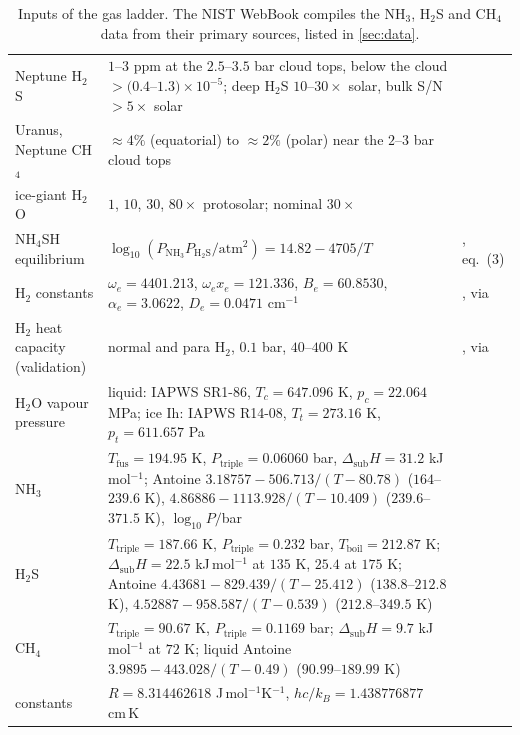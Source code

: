 \documentclass[11pt]{article}
\theoremstyle{definition}\newtheorem{definition}[theorem]{Definition}
\theoremstyle{remark}\newtheorem{remark}[theorem]{Remark}
\newcommand{\NH}{\mathrm{NH_3}}\newcommand{\HS}{\mathrm{H_2S}}\newcommand{\NHSH}{\mathrm{NH_4SH}}
\begin{document}
\begin{table}[!htb]
\begin{tabular}{@{}>{\raggedright\arraybackslash}p{3.0cm}>{\raggedright\arraybackslash}p{8.1cm}>{\raggedright\arraybackslash}p{3.8cm}@{}}
Neptune H$_2$S & $1$--$3$ ppm at the $2.5$--$3.5$ bar cloud tops, below the cloud $>(0.4$--$1.3)\times10^{-5}$; deep H$_2$S $10$--$30\times$ solar, bulk S/N $>5\times$ solar & \cite{Irwin2019a,dePater1991}\\
Uranus, Neptune CH$_4$ & $\approx4\%$ (equatorial) to $\approx2\%$ (polar) near the $2$--$3$ bar cloud tops & \cite{Irwin2019b}\\
ice-giant H$_2$O & $1$, $10$, $30$, $80\times$ protosolar; nominal $30\times$ & \cite{Atreya2020,Molter2021}\\
NH$_4$SH equilibrium & $\log_{10}(P_{\NH}P_{\HS}/\mathrm{atm}^2)=14.82-4705/T$ & \cite{AtreyaWong}, eq.~(3)\\
H$_2$ constants & $\omega_e=4401.213$, $\omega_ex_e=121.336$, $B_e=60.8530$, $\alpha_e=3.0622$, $D_e=0.0471$ cm$^{-1}$ & \cite{HuberHerzberg}, via \cite{NISTWebBook}\\
H$_2$ heat capacity (validation) & normal and para H$_2$, $0.1$ bar, $40$--$400$ K & \cite{Leachman}, via \cite{NISTWebBook}\\
H$_2$O vapour pressure & liquid: IAPWS SR1-86, $T_c=647.096$ K, $p_c=22.064$ MPa; ice Ih: IAPWS R14-08, $T_t=273.16$ K, $p_t=611.657$ Pa & \cite{WagnerPruss,Wagner2011}\\
NH$_3$ & $T_\mathrm{fus}=194.95$ K, $P_\mathrm{triple}=0.06060$ bar, $\Delta_\mathrm{sub}H=31.2$ kJ\,mol$^{-1}$; Antoine $3.18757-506.713/(T-80.78)$ ($164$--$239.6$ K), $4.86886-1113.928/(T-10.409)$ ($239.6$--$371.5$ K), $\log_{10}P/$bar & \cite{NISTWebBook}\\
H$_2$S & $T_\mathrm{triple}=187.66$ K, $P_\mathrm{triple}=0.232$ bar, $T_\mathrm{boil}=212.87$ K; $\Delta_\mathrm{sub}H=22.5$ kJ\,mol$^{-1}$ at $135$ K, $25.4$ at $175$ K; Antoine $4.43681-829.439/(T-25.412)$ ($138.8$--$212.8$ K), $4.52887-958.587/(T-0.539)$ ($212.8$--$349.5$ K) & \cite{NISTWebBook}\\
CH$_4$ & $T_\mathrm{triple}=90.67$ K, $P_\mathrm{triple}=0.1169$ bar; $\Delta_\mathrm{sub}H=9.7$ kJ\,mol$^{-1}$ at $72$ K; liquid Antoine $3.9895-443.028/(T-0.49)$ ($90.99$--$189.99$ K) & \cite{NISTWebBook}\\
constants & $R=8.314462618$ J\,mol$^{-1}$K$^{-1}$, $hc/k_B=1.438776877$ cm\,K & \cite{CODATA}\\\bottomrule
\end{tabular}
\caption{Inputs of the gas ladder. The NIST WebBook compiles the NH$_3$, H$_2$S and CH$_4$ data from their primary sources, listed in \cref{sec:data}.}\label{tab:ladderinputs}
\end{table}
\end{document}

